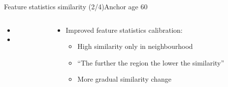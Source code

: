 \begin{frame}{Feature statistics similarity (2/4)}{Anchor age 60}
\begin{columns}
\begin{column}{0.5\textwidth}
\begin{itemize}
				\item {}
				\item {}
			\end{itemize}
		\end{column}
		\begin{column}{0.5\textwidth}
			\begin{itemize}
				\item Improved feature statistics calibration:
				\begin{itemize}
					\vspace{-1.5em}
					\scriptsize
					\item High similarity only in neighbourhood
					\item ``The further the region the lower the similarity''
					\item More gradual similarity change
				\end{itemize}
			\end{itemize}
		\end{column}
	\end{columns}
\end{frame}

